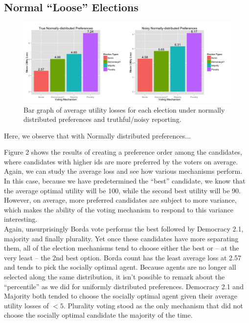 \documentclass[11pt]{scrartcl}
\begin{document}
\subsection{Normal ``Loose'' Elections}
\begin{figure}[H]\center
\includegraphics[scale=0.38]{normal.png}
\caption{Bar graph of average utility losses for each election under normally distributed preferences and truthful/noisy reporting.}
\end{figure}
Here, we observe that with Normally distributed preferences...

Figure 2 shows the results of creating a preference order among the candidates, where candidates with higher ids are more preferred by the voters on average. Again, we can study the average loss and see how various mechanisms perform. In this case, because we have predetermined the ``best'' candidate, we know that the average optimal utility will be 100, while the second best utility will be 90. However, on average, more preferred candidates are subject to more variance, which makes the ability of the voting mechanism to respond to this variance interesting.\\

Again, unsurprisingly Borda vote performs the best followed by Democracy 2.1, majority and finally plurality. Yet once these candidates have more separating them, all of the election mechanisms tend to choose either the best or -- at the very least -- the 2nd best option. Borda count has the least average loss at 2.57 and tends to pick the socially optimal agent. Because agents are no longer all selected along the same distribution, it isn't possible to remark about the ``percentile'' as we did for uniformly distributed preferences. Democracy 2.1 and Majority both tended to choose the socially optimal agent given their average utility losses of $<5$. Plurality voting stood as the only mechanism that did not choose the socially optimal candidate the majority of the time.\\
\end{document}
